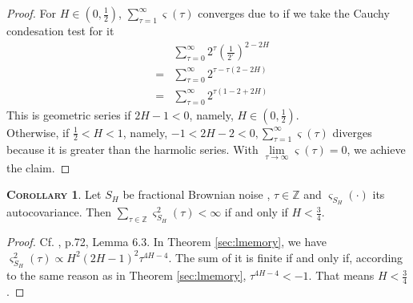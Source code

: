 \documentclass[a4paper, twoside, 11pt]{article}
\theoremstyle{definition}
\newtheorem{corollary}[definition]{\scshape Corollary}
\begin{document}
\begin{proof}

 For $H \in (0, \frac{1}{2})$, $\sum\limits_{\tau=1}^{\infty} \varsigma(\tau)$ converges due to if we take the Cauchy condesation test for it
 \begin{eqnarray*}
&& \sum_{\tau=0}^{\infty} 2^{\tau} (\frac{1}{2^\tau})^{2-2H} \\
&=& \sum_{\tau=0}^{\infty} 2^{\tau - \tau(2-2H)} \\
&=& \sum_{\tau=0}^{\infty} 2^{\tau(1-2+2H)}
\end{eqnarray*}
This is geometric series if $2H-1<0$, namely, $H\in(0,\frac{1}{2})$.  \\
Otherwise, if $\frac{1}{2} < H < 1$, namely, $-1<2H-2<0, \sum\limits_{\tau=1}^{\infty} \varsigma(\tau) $ diverges because it is greater than the harmolic series. With $\lim\limits_{\tau\rightarrow \infty}\varsigma(\tau)=0$, we achieve the claim. 
\end{proof}

\begin{corollary}
  Let $S_H$ be fractional Brownian noise , $\tau\in\mathbb{Z}$ and $\varsigma_{S_H}(\cdot)$ its autocovariance. Then $\sum_{\tau\in\mathbb{Z}}\varsigma^2_{S_H}(\tau)<\infty$ if and only if $H < \frac{3}{4}$.
\end{corollary}
\begin{proof}
  Cf. \cite{nourdin}, p.72, Lemma 6.3. In Theorem \ref{sec:lmemory}, we have $\varsigma_{S_H}^2(\tau) \propto H^2(2H-1)^2\tau^{4H-4} $. The sum of it is finite if and only if, according to the same reason as in Theorem \ref{sec:lmemory}, $\tau^{4H-4}<-1$. That means $H < \frac{3}{4}$.
\end{proof}
\end{document}
